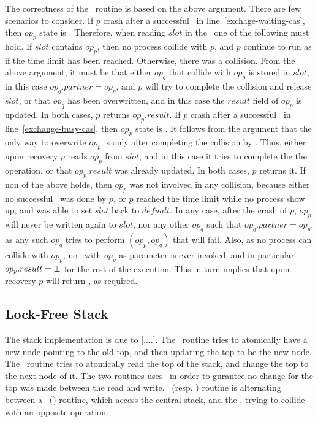 The correctness of the \recoverExchange\ routine is based on the above argument. There are few scenarios to consider.
If $p$ crash after a successful \CAS\ in line~\ref{exchage-waiting-cas}, then $op_p$ state is \waiting. Therefore, when reading $slot$ in the \recoverExchange\ one of the following must hold. If $slot$ contains $op_p$, then no process collide with $p$, and $p$ continue to run as if the time limit has been reached. Otherwise, there was a collision. From the above argument, it must be that either $op_q$ that collide with $op_p$ is stored in $slot$, in this case $op_q.partner = op_p$, and $p$ will try to complete the collision and release $slot$, or that $op_q$ has been overwritten, and in this case the $result$ field of $op_p$ is updated. In both cases, $p$ returns $op_p.result$.
If $p$ crash after a successful \CAS\ in line~\ref{exchange-busy-cas}, then $op_p$ state is \busy. It follows from the argument that the only way to overwrite $op_p$ is only after completing the collision by \switchPair. Thus, either upon recovery $p$ reads $op_p$ from $slot$, and in this case it tries to complete the the operation, or that $op_p.result$ was already updated. In both cases, $p$ returns it.
If non of the above holds, then $op_p$ was not involved in any collision, because either no successful \CAS\ was done by $p$, or $p$ reached the time limit while no process show up, and was able to set $slot$ back to $defualt$. In any case, after the crash of $p$, $op_p$ will never be written again to $slot$, nor any other $op_q$ such that $op_q.partner = op_p$, as any such $op_q$ tries to perform \CAS$(op_p,op_q)$ that will fail. Also, as no process can collide with $op_p$, no \switchPair\ with $op_p$ as parameter is ever invoked, and in particular $op_p.result = \mbox{$\bot$}$ for the rest of the execution. This in turn implies that upon recovery $p$ will return \fail, as required.


\subsection{Lock-Free Stack}

The stack implementation is due to [....]. The \trypush\ routine tries to atomically have a new node pointing to the old top, and then updating the top to be the new node. The \trypop\ routine tries to atomically read the top of the stack, and change the top to the next node of it. The two routines uses \CAS\ in order to gurantee no change for the top was made between the read and write.
\push\ (resp. \pop) routine is alternating between a \trypush\ (\trypop) routine, which access the central stack, and the \exchange, trying to collide with an opposite operation.

